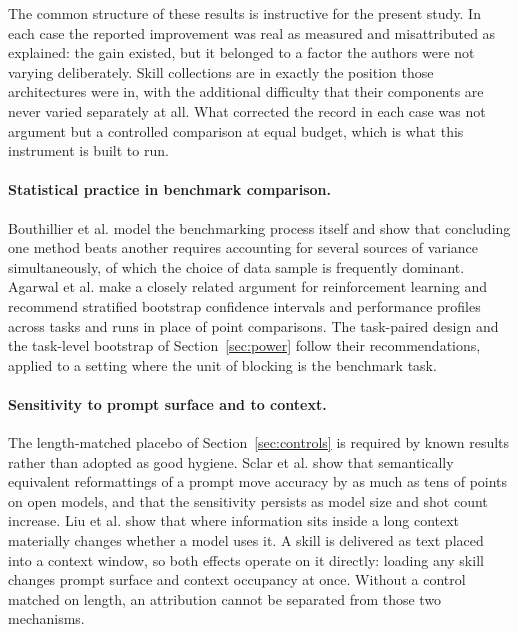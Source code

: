 \documentclass[11pt]{article}
\theoremstyle{plain}
\theoremstyle{definition}
\theoremstyle{remark}
\begin{document}
The common structure of these results is instructive for the present study. In each case the reported improvement was real as measured and misattributed as explained: the gain existed, but it belonged to a factor the authors were not varying deliberately. Skill collections are in exactly the position those architectures were in, with the additional difficulty that their components are never varied separately at all. What corrected the record in each case was not argument but a controlled comparison at equal budget, which is what this instrument is built to run.

\paragraph{Statistical practice in benchmark comparison.} Bouthillier et al. \cite{bouthillier} model the benchmarking process itself and show that concluding one method beats another requires accounting for several sources of variance simultaneously, of which the choice of data sample is frequently dominant. Agarwal et al. \cite{agarwal} make a closely related argument for reinforcement learning and recommend stratified bootstrap confidence intervals and performance profiles across tasks and runs in place of point comparisons. The task-paired design and the task-level bootstrap of Section~\ref{sec:power} follow their recommendations, applied to a setting where the unit of blocking is the benchmark task.

\paragraph{Sensitivity to prompt surface and to context.} The length-matched placebo of Section~\ref{sec:controls} is required by known results rather than adopted as good hygiene. Sclar et al. \cite{sclar} show that semantically equivalent reformattings of a prompt move accuracy by as much as tens of points on open models, and that the sensitivity persists as model size and shot count increase. Liu et al. \cite{lostmiddle} show that where information sits inside a long context materially changes whether a model uses it. A skill is delivered as text placed into a context window, so both effects operate on it directly: loading any skill changes prompt surface and context occupancy at once. Without a control matched on length, an attribution cannot be separated from those two mechanisms.
\end{document}
